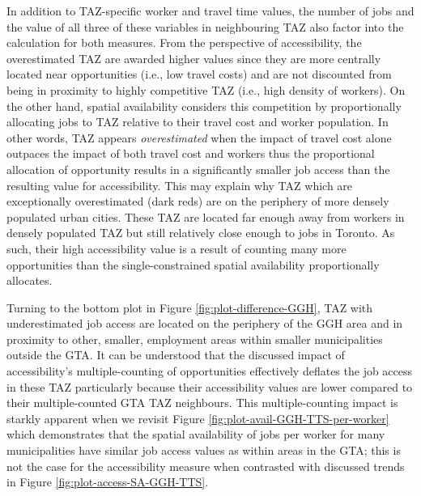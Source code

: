 \documentclass[]{elsarticle} %
\begin{document}
In addition to TAZ-specific worker and travel time values, the number of
jobs and the value of all three of these variables in neighbouring TAZ
also factor into the calculation for both measures. From the perspective
of accessibility, the overestimated TAZ are awarded higher values since
they are more centrally located near opportunities (i.e., low travel
costs) and are not discounted from being in proximity to highly
competitive TAZ (i.e., high density of workers). On the other hand,
spatial availability considers this competition by proportionally
allocating jobs to TAZ relative to their travel cost and worker
population. In other words, TAZ appears \emph{overestimated} when the
impact of travel cost alone outpaces the impact of both travel cost and
workers thus the proportional allocation of opportunity results in a
significantly smaller job access than the resulting value for
accessibility. This may explain why TAZ which are exceptionally
overestimated (dark reds) are on the periphery of more densely populated
urban cities. These TAZ are located far enough away from workers in
densely populated TAZ but still relatively close enough to jobs in
Toronto. As such, their high accessibility value is a result of counting
many more opportunities than the single-constrained spatial availability
proportionally allocates.

Turning to the bottom plot in Figure \ref{fig:plot-difference-GGH}, TAZ
with underestimated job access are located on the periphery of the GGH
area and in proximity to other, smaller, employment areas within smaller
municipalities outside the GTA. It can be understood that the discussed
impact of accessibility's multiple-counting of opportunities effectively
deflates the job access in these TAZ particularly because their
accessibility values are lower compared to their multiple-counted GTA
TAZ neighbours. This multiple-counting impact is starkly apparent when
we revisit Figure \ref{fig:plot-avail-GGH-TTS-per-worker} which
demonstrates that the spatial availability of jobs per worker for many
municipalities have similar job access values as within areas in the
GTA; this is not the case for the accessibility measure when contrasted
with discussed trends in Figure \ref{fig:plot-access-SA-GGH-TTS}.
\end{document}

